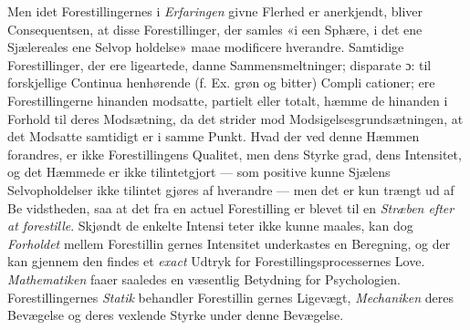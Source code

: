 \documentclass[12pt,a4paper]{book}
\begin{document}
Men idet Forestillingernes i \emph{Erfaringen} givne Flerhed
er anerkjendt, bliver Consequentsen, at disse Forestillinger,
der samles «i een Sphære, i det ene Sjælereales ene Selvop\-%
holdelse» maae modificere hverandre. Samtidige Forestillinger,
der ere ligeartede, danne Sammensmeltninger; disparate ɔ: til
forskjellige Continua henhørende (f. Ex. grøn og bitter) Compli\-%
cationer; ere Forestillingerne hinanden modsatte, partielt eller
totalt, hæmme de hinanden i Forhold til deres Modsætning, da
det strider mod Modsigelsesgrundsætningen, at det Modsatte
samtidigt er i samme Punkt. Hvad der ved denne Hæmmen
forandres, er ikke Forestillingens Qualitet, men dens Styrke\-%
grad, dens Intensitet, og det Hæmmede er ikke tilintetgjort
--- som positive kunne Sjælens Selvopholdelser ikke tilintet\-%
gjøres af hverandre --- men det er kun trængt ud af Be\-%
vidstheden, saa at det fra en actuel Forestilling er blevet til
en \emph{Stræben efter at forestille}. Skjøndt de enkelte Intensi\-%
teter ikke kunne maales, kan dog \emph{Forholdet} mellem Forestillin\-%
gernes Intensitet underkastes en Beregning, og der kan gjennem
den findes et \emph{exact} Udtryk for Forestillingsprocessernes Love.
\emph{Mathematiken} faaer saaledes en væsentlig Betydning for
Psychologien. Forestillingernes \emph{Statik} behandler Forestillin\-%
gernes Ligevægt, \emph{Mechaniken} deres Bevægelse og deres
vexlende Styrke under denne Bevægelse.
\end{document}
